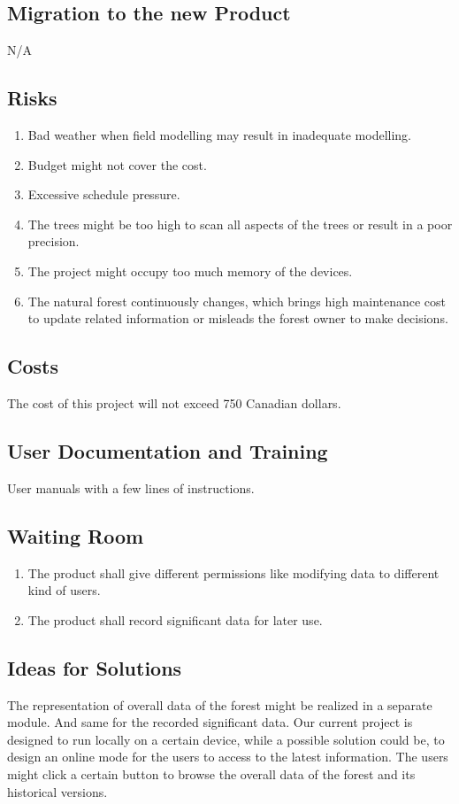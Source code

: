 \documentclass{article}
\begin{document}
\subsection{Migration to the new Product}
N/A
\subsection{Risks}
\begin{enumerate}
    \item Bad weather when field modelling may result in inadequate modelling.
    \item Budget might not cover the cost.
    \item Excessive schedule pressure.
    \item The trees might be too high to scan all aspects of the trees or result in a poor precision.
    \item The project might occupy too much memory of the devices.
    \item The natural forest continuously changes, which brings high maintenance cost to update related information or misleads the forest owner to make decisions. 
\end{enumerate}
\subsection{Costs}
The cost of this project will not exceed 750 Canadian dollars.
\subsection{User Documentation and Training}
User manuals with a few lines of instructions. 
\subsection{Waiting Room}
\begin{enumerate}
    \item The product shall give different permissions like modifying data to different kind of users.
    \item The product shall record significant data for later use.
\end{enumerate}
\subsection{Ideas for Solutions}
The representation of overall data of the forest might be realized in a separate module. And same for the recorded significant data. Our current project is designed to run locally on a certain device, while a possible solution could be, to design an online mode for the users to access to the latest information. The users might click a certain button to browse the overall data of the forest and its historical versions. 
\end{document}
